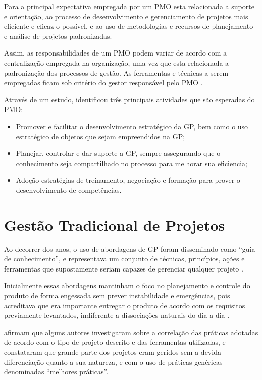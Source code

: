 Para  a principal expectativa empregada por um PMO esta relacionada a suporte e orientação, ao processo de desenvolvimento e gerenciamento de projetos mais eficiente e eficaz o possível, e ao uso de metodologias e recursos de planejamento e análise de projetos padronizadas.

Assim, as responsabilidades de um PMO podem variar de acordo com a centralização empregada na organização, uma vez que esta relacionada a padronização dos processos de gestão. As ferramentas e técnicas a serem empregadas ficam sob critério do gestor responsável pelo PMO \cite{pmiguide2001}.

Através de um estudo,  identificou três principais atividades que são esperadas do PMO:

\begin{itemize}
  \item Promover e facilitar o desenvolvimento estratégico da GP, bem como o uso estratégico de objetos que sejam empreendidos na GP;
  \item Planejar, controlar e dar suporte a GP, sempre assegurando que o conhecimento seja compartilhado no processo para melhorar sua eficiencia;
  \item Adoção estratégias de treinamento, negociação e formação para prover o desenvolvimento de competências.
\end{itemize}


\section{Gestão Tradicional de Projetos}

Ao decorrer dos anos, o uso de abordagens de GP foram disseminado como “guia de conhecimento”, e representava um conjunto de técnicas, princípios, ações e ferramentas que supostamente seriam capazes de gerenciar qualquer projeto \cite{kolltveit2007perspectives, shenhar2007reinventing}.

Inicialmente essas abordagens mantinham o foco no planejamento e controle do produto de forma engessada sem prever instabilidade e emergências, pois acreditava que era importante entregar o produto de acordo com os requisitos previamente levantados, indiferente a dissociações naturais do dia a dia \cite{winter2006directions}.

 afirmam que alguns autores investigaram sobre a correlação das práticas adotadas de acordo com o tipo de projeto descrito e das ferramentas utilizadas, e constataram que grande parte dos projetos eram geridos sem a devida diferenciação quanto a sua natureza, e com o uso de práticas genéricas denominadas “melhores práticas”.

